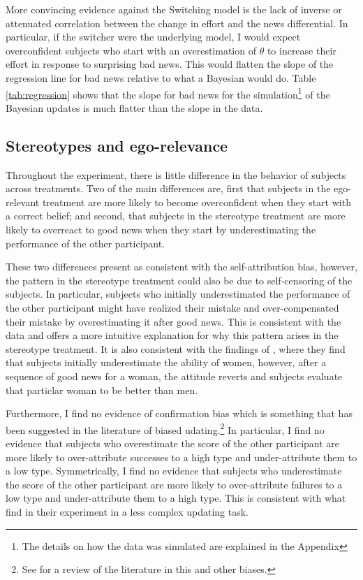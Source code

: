 \documentclass[
  12pt,
]{article}
\begin{document}
More convincing evidence against the Switching model is the lack of
inverse or attenuated correlation between the change in effort and the
news differential. In particular, if the switcher were the underlying
model, I would expect overconfident subjects who start with an
overestimation of \(\theta\) to increase their effort in response to
surprising bad news. This would flatten the slope of the regression line
for bad news relative to what a Bayesian would do. Table
\ref{tab:regression} shows that the slope for bad news for the
simulation\footnote{The details on how the data was simulated are explained in the Appendix}
of the Bayesian updates is much flatter than the slope in the data.

\hypertarget{stereotypes-and-ego-relevance}{%
\subsection{Stereotypes and
ego-relevance}\label{stereotypes-and-ego-relevance}}

Throughout the experiment, there is little difference in the behavior of
subjects across treatments. Two of the main differences are, first that
subjects in the ego-relevant treatment are more likely to become
overconfident when they start with a correct belief; and second, that
subjects in the stereotype treatment are more likely to overreact to
good news when they start by underestimating the performance of the
other participant.

These two differences present as consistent with the self-attribution
bias, however, the pattern in the stereotype treatment could also be due
to self-censoring of the subjects. In particular, subjects who initially
underestimated the performance of the other participant might have
realized their mistake and over-compensated their mistake by
overestimating it after good news. This is consistent with the data and
offers a more intuitive explanation for why this pattern arises in the
stereotype treatment. It is also consistent with the findings of
\citet{Bohren2019}, where they find that subjects initially
underestimate the ability of women, however, after a sequence of good
news for a woman, the attitude reverts and subjects evaluate that
particlar woman to be better than men.

Furthermore, I find no evidence of confirmation bias which is something
that has been suggested in the literature of biased
udating.\footnote{See \citet{benjamin2019} for a review of the literature in this and 
other biases.} In particular, I find no evidence that subjects who
overestimate the score of the other participant are more likely to
over-attribute successes to a high type and under-attribute them to a
low type. Symmetrically, I find no evidence that subjects who
underestimate the score of the other participant are more likely to
over-attribute failures to a low type and under-attribute them to a high
type. This is consistent with what \citet{Mobius2022} find in their
experiment in a less complex updating task.
\end{document}
